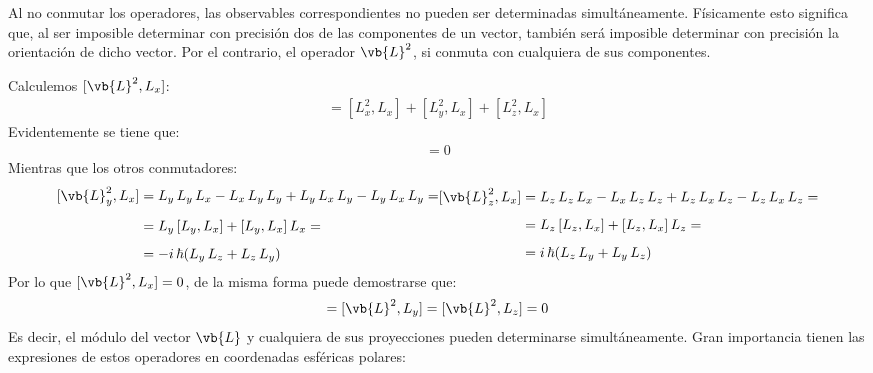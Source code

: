 Al no conmutar los operadores, las observables correspondientes no pueden ser determinadas simultáneamente. Físicamente esto significa que, al ser imposible determinar con precisión dos de las componentes de un vector, también será imposible determinar con precisión la orientación de dicho vector. Por el contrario, el operador $\vb{L}^{2}$, si conmuta con cualquiera de sus componentes.
\par
Calculemos $[\vb{L}^{2}, L_{x}]$:
\begin{align}
[\vb{L}^{2}, L_{x}] = [{L}_{x}^{2}, L_{x}] + [{L}_{y}^{2}, L_{x}] + [{L}_{z}^{2}, L_{x}]
\label{eq:ecuacion_05_13}
\end{align} 
Evidentemente se tiene que:
\begin{align*}
[\vb{L}_{x}^{2}, L_{x}] = 0
\end{align*}
Mientras que los otros conmutadores:
\begin{subequations}
\begin{align}
\begin{aligned}[b]
[\vb{L}_{y}^{2}, L_{x}] &= L_{y} \, L_{y} \, L_{x} - L_{x} \, L_{y} \, L_{y} + L_{y} \, L_{x} \, L_{y} - L_{y} \, L_{x} \, L_{y} =  \\[0.5em]
&= L_{y} \, [L_{y} , L_{x}] + [L_{y} , L_{x}] \, L_{x} = \\[0.5em]
&= - i \, \hbar (L_{y} \, L_{z} + L_{z} \, L_{y})
\end{aligned}
\label{eq:ecuacion_0514a}
\end{align}
\begin{align}
\begin{aligned}[b]
[\vb{L}_{z}^{2}, L_{x}] &= L_{z} \, L_{z} \, L_{x} - L_{x} \, L_{z} \, L_{z} + L_{z} \, L_{x} \, L_{z} - L_{z} \, L_{x} \, L_{z} =  \\[0.5em]
&= L_{z} \, [L_{z} , L_{x}] + [L_{z} , L_{x}] \, L_{z} = \\[0.5em]
&= i \, \hbar (L_{z} \, L_{y} + L_{y} \, L_{z})
\end{aligned}
\label{eq:ecuacion_0514b}
\end{align}
\end{subequations}
Por lo que $[\vb{L}^{2}, L_{x}] = 0$, de la misma forma puede demostrarse que:
\begin{align}
[\vb{L}^{2}, L_{x}] = [\vb{L}^{2}, L_{y}] = [\vb{L}^{2}, L_{z}] = 0
\label{eq:ecuacion_05_15}
\end{align}
Es decir, el módulo del vector $\vb{L}$ y cualquiera de sus proyecciones pueden determinarse simultáneamente. Gran importancia tienen las expresiones de estos operadores en coordenadas esféricas polares:
